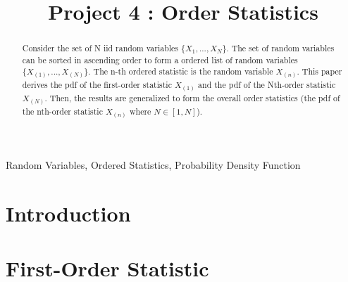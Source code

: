 \documentclass[conference]{IEEEtran}
\begin{document}
\title{Project 4 : Order Statistics}

\author{
}
\maketitle

\begin{abstract}
Consider the set of N iid random variables $\{X_1,...,X_N\}$. The set of random variables can be sorted in ascending order to form a ordered list of random variables $\{X_{(1)},...,X_{(N)}\}$. The n-th ordered statistic is the random variable $X_{(n)}$. This paper derives the pdf of the first-order statistic $X_{(1)}$ and the pdf of the Nth-order statistic $X_{(N)}$. Then, the results are generalized to form the overall order statistics (the pdf of the nth-order statistic $X_{(n)}$ where $N\in [1, N]$).
\end{abstract}

\begin{IEEEkeywords}
Random Variables, Ordered Statistics, Probability Density Function
\end{IEEEkeywords}

\section{Introduction}

%
\section{First-Order Statistic}

\label{First-Order Statistic Section}
\end{document}
